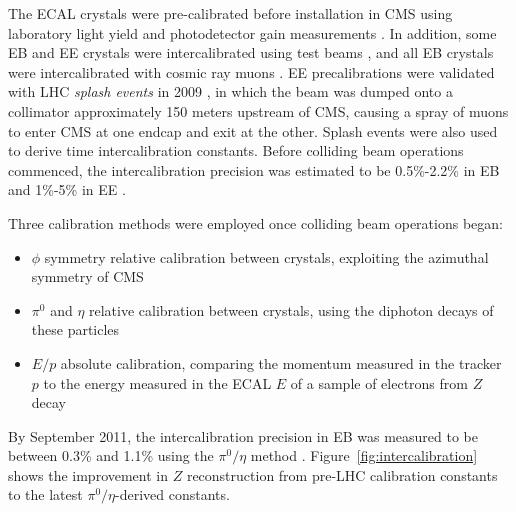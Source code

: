 \documentclass[dissertation.tex]{subfiles}
\begin{document}
The ECAL crystals were pre-calibrated before installation in CMS using laboratory light yield and photodetector gain measurements \cite{EB_performance_2006}.  In addition, some EB and EE crystals were intercalibrated using test beams \cite{EB_startup_intercalibration}, and all EB crystals were intercalibrated with cosmic ray muons \cite{CRAFT_calibration}.  EE precalibrations were validated with LHC \textit{splash events} in 2009 \cite{CRAFT_calibration, CRAFT_ECAL_performance}, in which the beam was dumped onto a collimator approximately 150 meters upstream of CMS, causing a spray of muons to enter CMS at one endcap and exit at the other.  Splash events were also used to derive time intercalibration constants.  Before colliding beam operations commenced, the intercalibration precision was estimated to be 0.5\%-2.2\% in EB and 1\%-5\% in EE \cite{CALOR_ECAL_calibration}.

Three calibration methods were employed once colliding beam operations began:

\begin{itemize}
\item $\phi$ symmetry relative calibration between crystals, exploiting the azimuthal symmetry of CMS
\item $\pi^{0}$ and $\eta$ relative calibration between crystals, using the diphoton decays of these particles
\item $E/p$ absolute calibration, comparing the momentum measured in the tracker $p$ to the energy measured in the ECAL $E$ of a sample of electrons from $Z$ decay
\end{itemize}
%
By September 2011, the intercalibration precision in EB was measured to be between 0.3\% and 1.1\% using the $\pi^{0}/\eta$ method \cite{Yang}.  Figure~\ref{fig:intercalibration} shows the improvement in $Z$ reconstruction from pre-LHC calibration constants to the latest $\pi^{0}/\eta$-derived constants.
\end{document}
